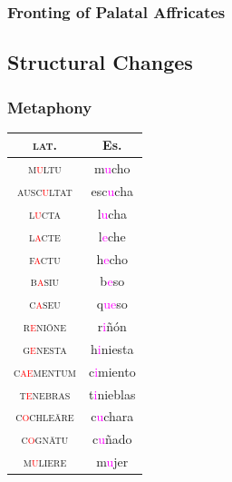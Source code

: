 \documentclass{report}[12pt]
\begin{document}
\subsubsection{Fronting of Palatal Affricates}\label{sec:palatal_affric_fronting}

\subsection{Structural Changes}

\subsubsection{Metaphony}

\begin{tcolorbox}
  
\end{tcolorbox}

\begin{tabular}{c c}
  \textsc{lat.} & Es. \\
  \hline
  \textsc{m\textcolor{red}{u}ltu} & m\textcolor{magenta}{u}cho \\
  \textsc{ausc\textcolor{red}{u}ltat} & esc\textcolor{magenta}{u}cha \\
  \textsc{l\textcolor{red}{u}cta} & l\textcolor{magenta}{u}cha \\
  \textsc{l\textcolor{red}{a}cte} & l\textcolor{magenta}{e}che \\
  \textsc{f\textcolor{red}{a}ctu} & h\textcolor{magenta}{e}cho \\
  \textsc{b\textcolor{red}{a}siu} & b\textcolor{magenta}{e}so \\
  \textsc{c\textcolor{red}{a}seu} & q\textcolor{magenta}{ue}so \\
  \textsc{r\textcolor{red}{e}ni\={o}ne} & r\textcolor{magenta}{i}ñón \\
  \textsc{g\textcolor{red}{e}nesta} & h\textcolor{magenta}{i}niesta \\
  \textsc{c\textcolor{red}{ae}mentum} & c\textcolor{magenta}{i}miento \\
  \textsc{t\textcolor{red}{e}nebras} & t\textcolor{magenta}{i}nieblas \\
  \textsc{c\textcolor{red}{o}chle\={a}re} & c\textcolor{magenta}{u}chara \\
  \textsc{c\textcolor{red}{o}gn\={a}tu} & c\textcolor{magenta}{u}ñado \\
  \textsc{m\textcolor{red}{u}liere} & m\textcolor{magenta}ujer \\
\end{tabular}
\end{document}
